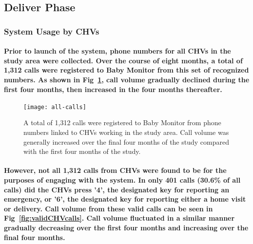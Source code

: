\subsection{Deliver Phase}

\subsubsection{System Usage by CHVs}
\paragraph{Prior to launch of the system, phone numbers for all CHVs in the study area were collected. Over the course of eight months, a total of 1,312 calls were registered to Baby Monitor from this set of recognized numbers. As shown in Fig~\ref{fig:allCHVcalls}, call volume gradually declined during the first four months, then increased in the four months thereafter.}

\begin{figure}[h]
	\begin{center}
	\texttt{[image: all-calls]}
	\end{center}
	\caption[All CHV Calls]{A total of 1,312 calls were registered to Baby Monitor from phone numbers linked to CHVs working in the study area. Call volume was generally increased over the final four months of the study compared with the first four months of the study.}
	\label{fig:allCHVcalls}
\end{figure}

\paragraph{However, not all 1,312 calls from CHVs were found to be for the purposes of engaging with the system. In only 401 calls (30.6\% of all calls)  did the CHVs press '4', the designated key for reporting an emergency, or '6', the designated key for reporting either a home visit or delivery. Call volume from these valid calls can be seen in Fig~\ref{fig:validCHVcalls}. Call volume fluctuated in a similar manner gradually decreasing over the first four months and increasing over the final four months.}


